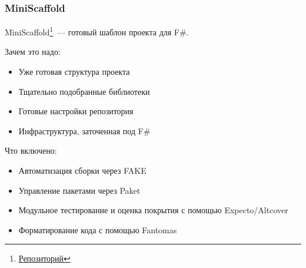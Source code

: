\documentclass[aspectratio=169]{beamer}
\begin{document}
\begin{frame}
    \frametitle{MiniScaffold}
    MiniScaffold\footnote{\href{https://github.com/TheAngryByrd/MiniScaffold}{Репозиторий}}~--- готовый шаблон проекта для F\#.

    \begin{minipage}{0.45\linewidth}
        Зачем это надо:
        \begin{itemize}
            \item Уже готовая структура проекта
            \item Тщательно подобранные библиотеки
            \item Готовые настройки репозитория
            \item Инфраструктура, заточенная под F\#
        \end{itemize}
    \end{minipage}
    \begin{minipage}{0.45\linewidth}
        Что включено:
        \begin{itemize}
            \item Автоматизация сборки через FAKE
            \item Управление пакетами через Paket
            \item Модульное тестирование и оценка покрытия с помощью Expecto/Altcover
            \item Форматирование кода с помощью Fantomas
        \end{itemize}
    \end{minipage}


\end{frame}
\end{document}
